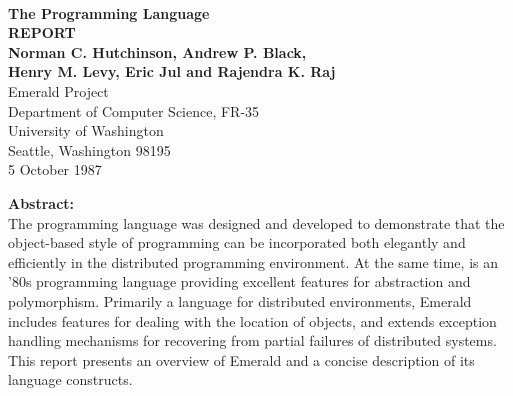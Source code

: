 \begin{titlepage}
\vspace{2in}
\\[0.9in]
\begin{center}
{\Large {\bf The \emd{} Programming Language}\\[0.1in] }
{\large {\bf REPORT}\\[0.4in]}
{\large {\bf Norman C. Hutchinson, Andrew P. Black,\\
         Henry M. Levy, Eric Jul and Rajendra K. Raj
}} \\[0.1in]
Emerald Project\\
Department of Computer Science, FR-35\\
University of Washington\\
Seattle, Washington 98195\\[0.1in]
5 October 1987\\[1.0in]
\end{center}
\begin{center}
\parbox{5.0in}{
{\bf Abstract:}\\[0.15in]
The programming language \emd{} was designed and developed 
to demonstrate that the
object-based style of programming can be incorporated both elegantly and
efficiently in the distributed programming environment.
At the same time, \emd{} is an '80s programming language providing excellent
features for abstraction and polymorphism. Primarily a language for distributed
environments, Emerald includes features for dealing with the location of objects,
and extends exception handling mechanisms for recovering from partial failures
of distributed systems. This report presents an overview of
Emerald and a concise description of its language constructs.
}
\end{center}
\end{titlepage}
